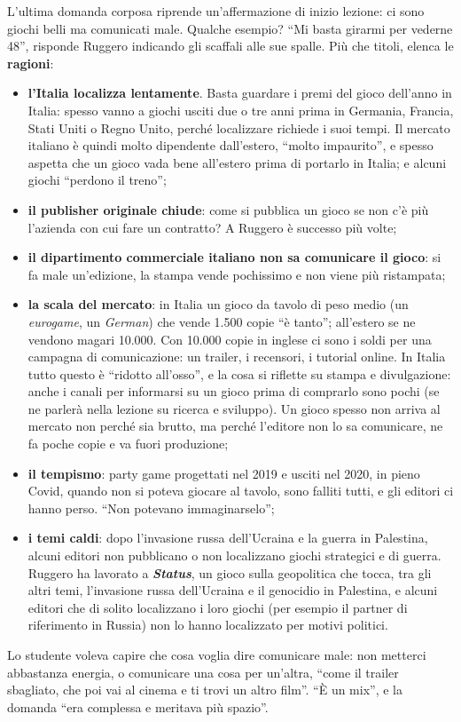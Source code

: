 L'ultima domanda corposa riprende un'affermazione di inizio lezione: ci sono
giochi belli ma comunicati male. Qualche esempio? ``Mi basta girarmi per
vederne 48'', risponde Ruggero indicando gli scaffali alle sue spalle. Più che
titoli, elenca le \textbf{ragioni}:
\begin{itemize}
  \item \textbf{l'Italia localizza lentamente}. Basta guardare i premi del gioco
        dell'anno in Italia: spesso vanno a giochi usciti due o tre anni prima in
        Germania, Francia, Stati Uniti o Regno Unito, perché localizzare richiede i
        suoi tempi. Il mercato italiano è quindi molto dipendente dall'estero,
        ``molto impaurito'', e spesso aspetta che un gioco vada bene all'estero
        prima di portarlo in Italia; e alcuni giochi ``perdono il treno'';
  \item \textbf{il publisher originale chiude}: come si pubblica un gioco se non
        c'è più l'azienda con cui fare un contratto? A Ruggero è successo più
        volte;
  \item \textbf{il dipartimento commerciale italiano non sa comunicare il gioco}:
        si fa male un'edizione, la stampa vende pochissimo e non viene più
        ristampata;
  \item \textbf{la scala del mercato}: in Italia un gioco da tavolo di peso medio
        (un \emph{eurogame}, un \emph{German}) che vende 1.500 copie ``è tanto'';
        all'estero se ne vendono magari 10.000. Con 10.000 copie in inglese ci
        sono i soldi per una campagna di comunicazione: un trailer, i
        recensori, i tutorial online. In Italia tutto questo è ``ridotto all'osso'',
        e la cosa si riflette su stampa e divulgazione: anche i canali per
        informarsi su un gioco prima di comprarlo sono pochi (se ne parlerà nella
        lezione su ricerca e sviluppo). Un gioco spesso non arriva al mercato non
        perché sia brutto, ma perché l'editore non lo sa comunicare, ne fa poche
        copie e va fuori produzione;
  \item \textbf{il tempismo}: party game progettati nel 2019 e usciti nel 2020, in
        pieno Covid, quando non si poteva giocare al tavolo, sono falliti tutti, e
        gli editori ci hanno perso. ``Non potevano immaginarselo'';
  \item \textbf{i temi caldi}: dopo l'invasione russa dell'Ucraina e la guerra in
        Palestina, alcuni editori non pubblicano o non localizzano giochi
        strategici e di guerra. Ruggero ha lavorato a \textbf{\emph{Status}}, un
        gioco sulla geopolitica che tocca, tra gli altri temi, l'invasione russa
        dell'Ucraina e il genocidio in Palestina, e alcuni editori che di
        solito localizzano i loro giochi (per esempio il partner di riferimento in
        Russia) non lo hanno localizzato per motivi politici.
\end{itemize}
Lo studente voleva capire che cosa voglia dire comunicare male: non metterci
abbastanza energia, o comunicare una cosa per un'altra, ``come il trailer
sbagliato, che poi vai al cinema e ti trovi un altro film''. ``È un mix'', e la
domanda ``era complessa e meritava più spazio''.

